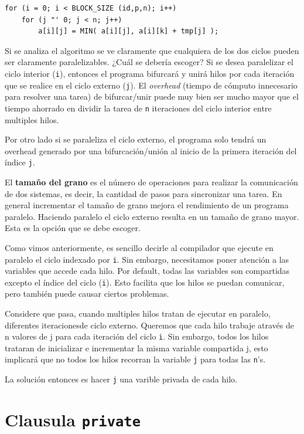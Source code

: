 \documentclass[12pt,letterpaper]{book}
\begin{document}
\begin{lstlisting}[style=C]
for (i = 0; i < BLOCK_SIZE (id,p,n); i++) 
	for (j "' 0; j < n; j++)
		a[i][j] = MIN( a[i][j], a[i][k] + tmp[j] );
\end{lstlisting}

Si se analiza el algoritmo se ve claramente que cualquiera de los dos ciclos pueden ser claramente paralelizables. ¿Cuál se debería escoger? Si se desea paralelizar el ciclo interior (\texttt{i}), entonces el programa bifurcará  y unirá hilos por cada iteración que se realice en el ciclo externo (\texttt{j}). El \textit{overhead} (tiempo de cómputo innecesario para resolver una tarea) de bifurcar/unir puede muy bien ser mucho mayor que el tiempo ahorrado en dividir la tarea de \texttt{n} iteraciones del ciclo interior entre multiples hilos. 

Por otro lado si se paraleliza el ciclo externo, el programa solo tendrá un overhead generado por una bifurcación/unión al inicio de la primera iteración del índice \texttt{j}.

El \textbf{tamaño del grano} es el número de operaciones para realizar la comunicación de dos sistemas, es decir, la cantidad de pasos para sincronizar una tarea. En general incrementar el tamaño de grano mejora el rendimiento de un programa paralelo. Haciendo paralelo el ciclo externo resulta en un tamaño de grano mayor. Esta es la opción que se debe escoger.

Como vimos anteriormente, es sencillo decirle al compilador que ejecute en paralelo el ciclo indexado por \texttt{i}. Sin embargo, necesitamos poner atención a las variables que accede cada hilo. Por default, todas las variables son compartidas excepto el índice del ciclo (\texttt{i}). Esto facilita que los hilos se puedan comunicar, pero también puede causar ciertos problemas.

Considere que pasa, cuando multiples hilos tratan de ejecutar en paralelo, diferentes iteracionesde ciclo externo. Queremos que cada hilo trabaje através de n valores de j para cada iteración del ciclo \texttt{i}. Sin embargo, todos los hilos trataran de inicializar e incrementar la misma variable compartida j, esto implicará que no todos los hilos recorran la variable \texttt{j} para todas las \texttt{n}'s.

La solución entonces es hacer \texttt{j} una varible privada de cada hilo.

\section{Clausula \texttt{private}}
\end{document}

